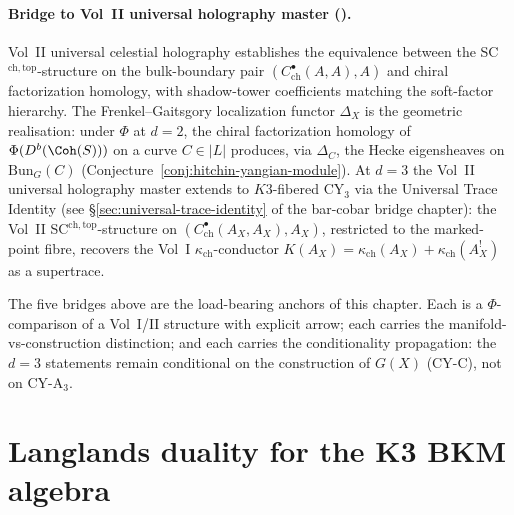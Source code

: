 \paragraph{Bridge to Vol~II universal holography master (\cite{VolII}).}
Vol~II universal celestial holography establishes the equivalence between the SC$^{\mathrm{ch,top}}$-structure on the bulk-boundary pair $(C^\bullet_{\mathrm{ch}}(A,A), A)$ and chiral factorization homology, with shadow-tower coefficients matching the soft-factor hierarchy. The Frenkel--Gaitsgory localization functor $\Delta_X$ is the geometric realisation: under $\Phi$ at $d = 2$, the chiral factorization homology of $\Phi(D^b(\Coh(S)))$ on a curve $C \in |L|$ produces, via $\Delta_C$, the Hecke eigensheaves on $\mathrm{Bun}_G(C)$ \textup{(}Conjecture~\ref{conj:hitchin-yangian-module}\textup{).} At $d = 3$ the Vol~II universal holography master extends to $K3$-fibered CY$_3$ via the Universal Trace Identity \textup{(}see \S\ref{sec:universal-trace-identity} of the bar-cobar bridge chapter\textup{):} the Vol~II SC$^{\mathrm{ch,top}}$-structure on $(C^\bullet_{\mathrm{ch}}(A_X, A_X), A_X)$, restricted to the marked-point fibre, recovers the Vol~I $\kappa_{\mathrm{ch}}$-conductor $K(A_X) = \kappa_{\mathrm{ch}}(A_X) + \kappa_{\mathrm{ch}}(A_X^!)$ as a supertrace.

\noindent The five bridges above are the load-bearing anchors of this chapter. Each is a \(\Phi\)-comparison of a Vol~I/II structure with explicit arrow; each carries the manifold-vs-construction distinction; and each carries the conditionality propagation: the $d = 3$ statements remain conditional on the construction of $G(X)$ \textup{(}CY-C\textup{),} not on CY-A$_3$.

\section{Langlands duality for the K3 BKM algebra}
\label{sec:glang-k3-bkm-langlands}

